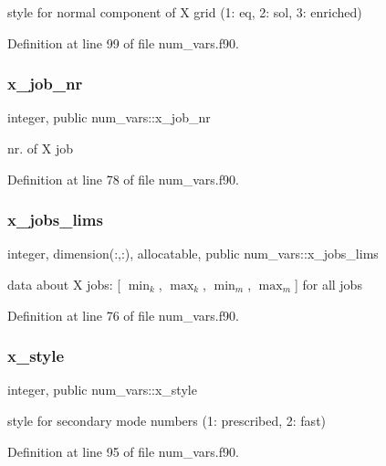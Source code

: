 style for normal component of X grid (1\+: eq, 2\+: sol, 3\+: enriched) 



Definition at line 99 of file num\+\_\+vars.\+f90.

\mbox{\label{namespacenum__vars_a9df427f6582f4528652b3607d1c681b3}} 
\subsubsection{\texorpdfstring{x\+\_\+job\+\_\+nr}{x\_job\_nr}}
{\footnotesize\ttfamily integer, public num\+\_\+vars\+::x\+\_\+job\+\_\+nr}



nr. of X job 



Definition at line 78 of file num\+\_\+vars.\+f90.

\mbox{\label{namespacenum__vars_a476c029a4a53aa1f707d54d18d3c80a0}} 
\subsubsection{\texorpdfstring{x\+\_\+jobs\+\_\+lims}{x\_jobs\_lims}}
{\footnotesize\ttfamily integer, dimension(\+:,\+:), allocatable, public num\+\_\+vars\+::x\+\_\+jobs\+\_\+lims}



data about X jobs\+: \mbox{[} $\min_k$, $\max_k$, $\min_m$, $\max_m$\mbox{]} for all jobs 



Definition at line 76 of file num\+\_\+vars.\+f90.

\mbox{\label{namespacenum__vars_ad847b8c0cbf1e841c788bd657b40af5f}} 
\subsubsection{\texorpdfstring{x\+\_\+style}{x\_style}}
{\footnotesize\ttfamily integer, public num\+\_\+vars\+::x\+\_\+style}



style for secondary mode numbers (1\+: prescribed, 2\+: fast) 



Definition at line 95 of file num\+\_\+vars.\+f90.

